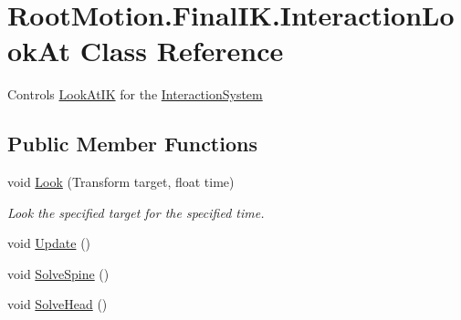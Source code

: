 \hypertarget{class_root_motion_1_1_final_i_k_1_1_interaction_look_at}{}\section{Root\+Motion.\+Final\+I\+K.\+Interaction\+Look\+At Class Reference}
\label{class_root_motion_1_1_final_i_k_1_1_interaction_look_at}


Controls \mbox{\hyperlink{class_root_motion_1_1_final_i_k_1_1_look_at_i_k}{Look\+At\+IK}} for the \mbox{\hyperlink{class_root_motion_1_1_final_i_k_1_1_interaction_system}{Interaction\+System}}  


\subsection*{Public Member Functions}
\begin{DoxyCompactItemize}
\item 
void \mbox{\hyperlink{class_root_motion_1_1_final_i_k_1_1_interaction_look_at_ab53fdc5347fdc87d0179f420d0db33fd}{Look}} (Transform target, float time)
\begin{DoxyCompactList}\small\item\em Look the specified target for the specified time. \end{DoxyCompactList}\item 
void \mbox{\hyperlink{class_root_motion_1_1_final_i_k_1_1_interaction_look_at_a63f4b9ee4e4153ceb88570a70a0dfec8}{Update}} ()
\item 
void \mbox{\hyperlink{class_root_motion_1_1_final_i_k_1_1_interaction_look_at_a2d6140ebed728175ecf4d148da24d026}{Solve\+Spine}} ()
\item 
void \mbox{\hyperlink{class_root_motion_1_1_final_i_k_1_1_interaction_look_at_a6c9407abe73912867e73a1736bd06ad7}{Solve\+Head}} ()
\end{DoxyCompactItemize}
